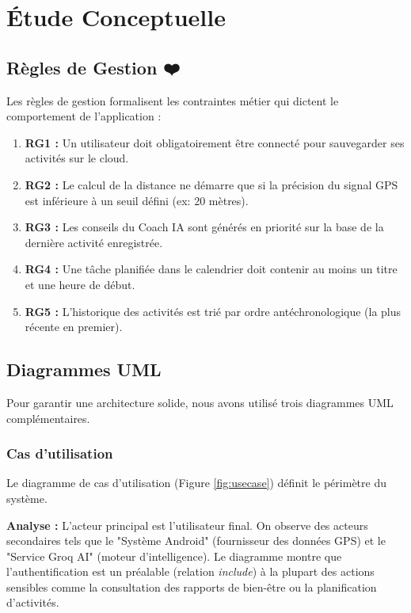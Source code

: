\documentclass[12pt,a4paper,oneside]{report}
\begin{document}
    \section{Étude Conceptuelle}

    \subsection{Règles de Gestion ❤️}

    Les règles de gestion formalisent les contraintes métier qui dictent le comportement de l'application :

    \begin{enumerate}
        \item \textbf{RG1 :} Un utilisateur doit obligatoirement être connecté pour sauvegarder ses activités sur le cloud.
        \item \textbf{RG2 :} Le calcul de la distance ne démarre que si la précision du signal GPS est inférieure à un seuil défini (ex: 20 mètres).
        \item \textbf{RG3 :} Les conseils du Coach IA sont générés en priorité sur la base de la dernière activité enregistrée.
        \item \textbf{RG4 :} Une tâche planifiée dans le calendrier doit contenir au moins un titre et une heure de début.
        \item \textbf{RG5 :} L'historique des activités est trié par ordre antéchronologique (la plus récente en premier).
    \end{enumerate}

    \subsection{Diagrammes UML}

    Pour garantir une architecture solide, nous avons utilisé trois diagrammes UML complémentaires.

    \subsubsection{Cas d’utilisation}

    Le diagramme de cas d'utilisation (Figure \ref{fig:usecase}) définit le périmètre du système.

    \textbf{Analyse :} L'acteur principal est l'utilisateur final. On observe des acteurs secondaires tels que le "Système Android" (fournisseur des données GPS) et le "Service Groq AI" (moteur d'intelligence). Le diagramme montre que l'authentification est un préalable (relation \textit{include}) à la plupart des actions sensibles comme la consultation des rapports de bien-être ou la planification d'activités.
\end{document}
